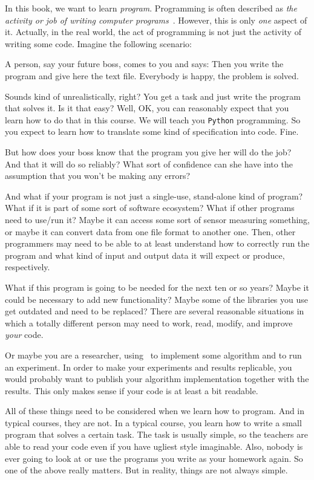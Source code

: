 \hsection{}%
%
%
In this book, we want to learn \emph{program}.
Programming is often described as \emph{the activity or job of writing computer programs}~\cite{CDE2024PMOPIE}.
However, this is only \emph{one} aspect of it.
Actually, in the real world, the act of programming is not just the activity of writing some code.
Imagine the following scenario:

A person, say your future boss, comes to you and says:
Then you write the program and give here the text file.
Everybody is happy, the problem is solved.

Sounds kind of unrealistically, right?
You get a task and just write the program that solves it.
Is it that easy?
Well, OK, you can reasonably expect that you learn how to do that in this course.
We will teach you \texttt{Python} programming.
So you expect to learn how to translate some kind of specification into code.
Fine.

But how does your boss know that the program you give her will do the job?
And that it will do so reliably?
What sort of confidence can she have into the assumption that you won't be making any errors?

And what if your program is not just a single-use, stand-alone kind of program?
What if it is part of some sort of software ecosystem?
What if other programs need to use/run it?
Maybe it can access some sort of sensor measuring something, or maybe it can convert data from one file format to another one.
Then, other programmers may need to be able to at least understand how to correctly run the program and what kind of input and output data it will expect or produce, respectively.

What if this program is going to be needed for the next ten or so years?
Maybe it could be necessary to add new functionality?
Maybe some of the libraries you use get outdated and need to be replaced?
There are several reasonable situations in which a totally different person may need to work, read, modify, and improve \emph{your} code.

Or maybe you are a researcher, using \python\ to implement some algorithm and to run an experiment.
In order to make your experiments and results replicable, you would probably want to publish your algorithm implementation together with the results.
This only makes sense if your code is at least a bit readable.

All of these things need to be considered when we learn how to program.
And in typical courses, they are not.
In a typical course, you learn how to write a small program that solves a certain task.
The task is usually simple, so the teachers are able to read your code even if you have ugliest style imaginable.
Also, nobody is ever going to look at or use the programs you write as your homework again.
So one of the above really matters.
But in reality, things are not always simple.

